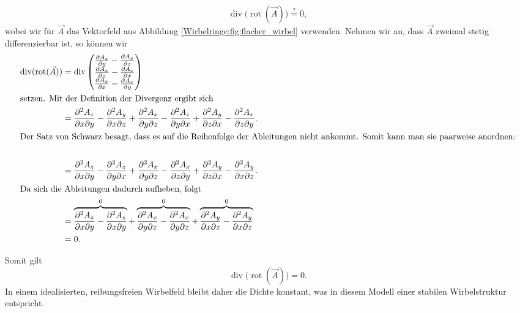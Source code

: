 \begin{equation}
\operatorname{div} \big( \operatorname{rot} ( \vec{A} ) \big)
\stackrel{?}{=}
0,
\end{equation}
wobei wir für \(\vec{A}\) das Vektorfeld aus Abbildung \ref{Wirbelringe:fig:flacher_wirbel} verwenden.
Nehmen wir an, dass \(\vec{A}\) zweimal stetig differenzierbar ist, so können wir
\begin{align*}
\operatorname{div} ( \operatorname{rot} ( \vec{A} ) )
&=
\operatorname{div}      
    \begin{pmatrix} 
        \frac{\partial A_z}{\partial y} - \frac{\partial A_y}{\partial z} \\ 
        \frac{\partial A_x}{\partial z} - \frac{\partial A_z}{\partial x} \\ 
        \frac{\partial A_y}{\partial x} - \frac{\partial A_x}{\partial y} \\ 
    \end{pmatrix} \\
\intertext{setzen. Mit der Definition der Divergenz ergibt sich}
&=
\frac{\partial^2 A_z}{\partial x \partial y} - \frac{\partial^2 A_y}{\partial x \partial z} + 
\frac{\partial^2 A_x}{\partial y \partial z} - \frac{\partial^2 A_z}{\partial y \partial x} +
\frac{\partial^2 A_y}{\partial z \partial x} - \frac{\partial^2 A_x}{\partial z \partial y}
.\\
\intertext{Der Satz von Schwarz besagt, dass es auf die Reihenfolge der Ableitungen nicht ankommt. Somit kann man sie paarweise anordnen:}\\
&=
\frac{\partial^2 A_z}{\partial x \partial y} - \frac{\partial^2 A_z}{\partial y \partial x} + 
\frac{\partial^2 A_x}{\partial y \partial z} - \frac{\partial^2 A_x}{\partial z \partial y} +
\frac{\partial^2 A_y}{\partial z \partial x} - \frac{\partial^2 A_y}{\partial x \partial z}.
\\
\intertext{Da sich die Ableitungen dadurch aufheben, folgt}
&=
\overbrace{\frac{\partial^2 A_z}{\partial x \partial y} - \frac{\partial^2 A_z}{\partial x \partial y}}^0 + 
\overbrace{\frac{\partial^2 A_x}{\partial y \partial z} - \frac{\partial^2 A_x}{\partial y \partial z}}^0 +
\overbrace{\frac{\partial^2 A_y}{\partial x \partial z} - \frac{\partial^2 A_y}{\partial x \partial z}}^0
\\
&=
0.
\end{align*}

 Somit gilt 
 \begin{equation} 
    \label{Wirbelringe:eq:wIdent} 
    \operatorname{div} \big( \operatorname{rot} ( \vec{A} ) \big) 
    = 
    0. 
\end{equation} 
In einem idealisierten, reibungsfreien Wirbelfeld bleibt daher die Dichte konstant, was in diesem Modell einer stabilen Wirbelstruktur entspricht.

